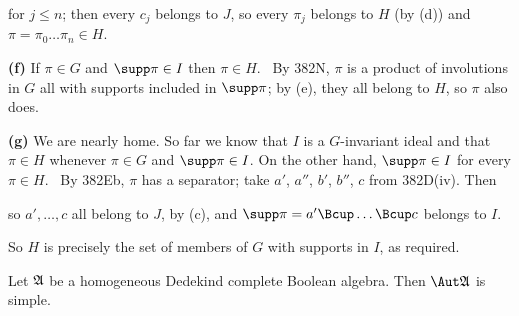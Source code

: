 {

\noindent for $j\le n$;  then every $c_j$ belongs to $J$, so every
$\pi_j$ belongs to $H$ (by (d)) and $\pi=\pi_0\ldots\pi_n\in H$.\ \Qed

\medskip

{\bf (f)} If $\pi\in G$ and $\supp\pi\in I$ then $\pi\in H$.   \Prf\ By
382N,  $\pi$ is a product of involutions in $G$ all with supports
included in $\supp\pi$;  by (e), they all belong to $H$, so $\pi$ also
does.\ \Qed

\medskip

{\bf (g)} We are nearly home.   So far we know that $I$ is a
$G$-invariant ideal and that $\pi\in H$ whenever $\pi\in G$ and
$\supp\pi\in I$.   On the other hand, $\supp\pi\in I$ for every
$\pi\in H$.   \Prf\ By 382Eb, $\pi$ has a separator;  take $a'$, $a''$,
$b'$, $b''$, $c$ from 382D(iv).   Then


\noindent so $a',\ldots,c$ all belong to $J$, by (c), and
$\supp\pi=a'\Bcup\ldots\Bcup c$ belongs to $I$.\ \Qed

So $H$ is precisely the set of members of $G$ with supports in $I$, as
required.
}%

 Let $\frak A$ be a homogeneous Dedekind
complete Boolean algebra.   Then $\Aut\frak A$ is simple.



